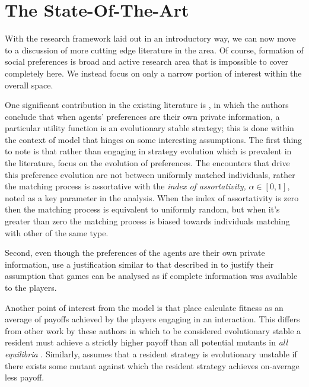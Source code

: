 \documentclass[11pt]{book}
\newcommand*{\np}{\par\noindent\newline}
\begin{document}
\section{The State-Of-The-Art}\label{state_of_the_art}
With the research framework laid out in an introductory way, we can now move to a discussion of more cutting edge
literature in the area. Of course, formation of social preferences is broad and active research area that is impossible
to cover completely here. 
We instead focus on only a narrow portion of interest within the overall space.

\np One significant contribution in the existing literature is \citet{alger_generalization_2012}, in which the authors conclude
that when agents' preferences are their own private information, a particular utility function is an evolutionary stable
strategy; this is done within the context of model that hinges on some interesting assumptions. 
The first thing to note is that rather than engaging in strategy evolution which is prevalent in the literature, \citet{alger_generalization_2012} focus
on the evolution of preferences. 
The encounters that drive this preference evolution are not between uniformly matched individuals, rather the matching process is assortative with the \textit{index of assortativity,} $\alpha \in [0, 1]$,
noted as a key parameter in the analysis. 
When the index of assortativity is zero then the matching process is equivalent to uniformly random, but when it's greater than zero the matching process is biased towards individuals
matching with other of the same type. 

\np Second, even though the preferences of the agents are their own private information,
 \citeauthor{alger_generalization_2012} use a justification similar to that described in \citet{kalai_rational_1993} 
 to justify their assumption that games can be analysed as if complete information was available to the players.

\np Another point of interest from the model is that \citeauthor{alger_generalization_2012} place calculate fitness as an average of payoffs achieved by the players engaging in an interaction.
This differs from other work by these authors in which to be considered evolutionary stable a resident must achieve a strictly higher payoff than all potential mutants in \textit{all equilibria} \citep[~p.
2274]{alger_homo_2013}. 
Similarly, \citet{alger_generalization_2012} assumes that a resident strategy is evolutionary unstable if there exists some mutant against which the resident strategy achieves on-average less payoff.
\end{document}

